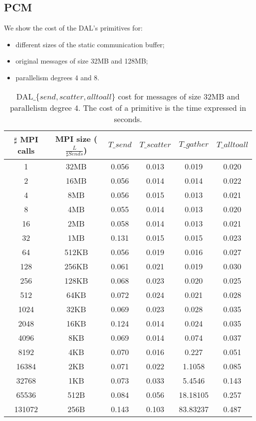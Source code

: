 \clearpage

\subsection*{PCM}
We show the cost of the DAL's primitives for:
\begin{itemize}
\item different sizes of the static communication buffer;
\item original messages of size 32MB and 128MB;
\item parallelism degrees 4 and 8.
\end{itemize} 

\begin{table}[h]
\begin{center}
\begin{tabular}{|c|c|c|c|c|c|}\hline
\hline
$\sharp$ MPI calls & MPI size ($\frac{L}{\sharp Sends}$)  & $T\_send$   & $T\_scatter$ & $T\_gather$ & $T\_alltoall$      \\\hline\hline
1 & 32MB & 0.056 & 0.013 & 0.019 & 0.020 \\\hline
2 & 16MB & 0.056 & 0.014 & 0.014 & 0.022 \\\hline
4 & 8MB & 0.056 & 0.015 & 0.013 & 0.021 \\\hline
8 & 4MB & 0.055 & 0.014 & 0.013 & 0.020 \\\hline
16 & 2MB & 0.058 & 0.014 & 0.013 & 0.021 \\\hline
32 & 1MB & 0.131 & 0.015 & 0.015 & 0.023 \\\hline
64 & 512KB & 0.056 & 0.019 & 0.016 & 0.027 \\\hline
128 & 256KB & 0.061 & 0.021 & 0.019 & 0.030 \\\hline
256 & 128KB & 0.068 & 0.023 & 0.020 & 0.025 \\\hline
512 & 64KB & 0.072 & 0.024 & 0.021 & 0.028 \\\hline
1024 & 32KB & 0.069 & 0.023 & 0.028 & 0.035 \\\hline
2048 & 16KB & 0.124 & 0.014 & 0.024 & 0.035 \\\hline
4096 & 8KB & 0.069 & 0.014 & 0.074 & 0.037 \\\hline
8192 & 4KB & 0.070 & 0.016 & 0.227 & 0.051 \\\hline
16384 & 2KB & 0.071 & 0.022 & 1.1058 & 0.085 \\\hline
32768 & 1KB & 0.073 & 0.033 & 5.4546 & 0.143 \\\hline
65536 & 512B & 0.084 & 0.056 & 18.18105 & 0.257 \\\hline
131072 & 256B & 0.143 & 0.103 & 83.83237 & 0.487 \\\hline
\end{tabular}
\caption{DAL$\_\lbrace send, scatter, alltoall \rbrace$ cost for messages of size 32MB and parallelism degree 4. The cost of a primitive is the time expressed in seconds.}
\label{tsetup-pcm-n4-M32}
\end{center}
\end{table}


